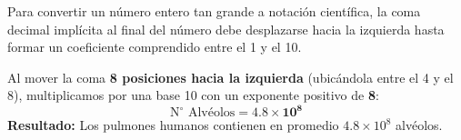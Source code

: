 \documentclass[12pt]{article}
\begin{document}
\begin{tcolorbox}
\begin{center}
    \end{center}

    \vspace{0.4cm}
    \begin{tcolorbox}[colback=medteal!10, colframe=medteal, arc=2mm, boxrule=1.2pt, title=\textbf{Desarrollo Matemático y Solución}]
        Para convertir un número entero tan grande a notación científica, la coma decimal implícita al final del número debe desplazarse hacia la izquierda hasta formar un coeficiente comprendido entre el 1 y el 10.
        
        Al mover la coma \textbf{8 posiciones hacia la izquierda} (ubicándola entre el 4 y el 8), multiplicamos por una base 10 con un exponente positivo de \textbf{8}:
        \[ \text{N}^{\circ} \text{ Alvéolos} = \mathbf{4.8 \times 10^8} \]
        \textbf{Resultado:} Los pulmones humanos contienen en promedio \textbf{$4.8 \times 10^8$} alvéolos.
    \end{tcolorbox}
    
\end{tcolorbox}
\end{document}
